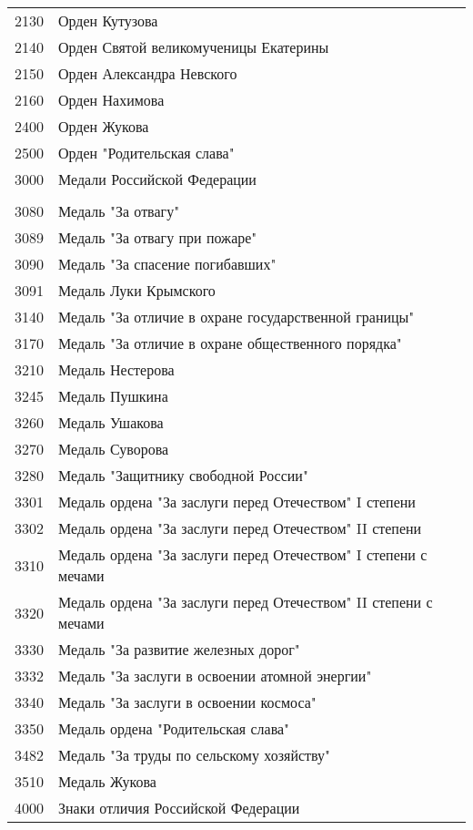 \documentclass[10pt, a4paper, titlepage]{article}
\begin{document}
\begin{center}
\begin{longtable}{rp{}}
        2130 & Орден Кутузова \\
        2140 & Орден Святой великомученицы Екатерины \\
        2150 & Орден Александра Невского \\
        2160 & Орден Нахимова \\
        2400 & Орден Жукова \\
        2500 & Орден "Родительская слава" \\
        3000 & Медали Российской Федерации \\ \\
        3080 & Медаль "За отвагу" \\
        3089 & Медаль "За отвагу при пожаре" \\
        3090 & Медаль "За спасение погибавших" \\
        3091 & Медаль Луки Крымского \\
        3140 & Медаль "За отличие в охране государственной границы" \\
        3170 & Медаль "За отличие в охране общественного порядка" \\
        3210 & Медаль Нестерова \\
        3245 & Медаль Пушкина \\
        3260 & Медаль Ушакова \\
        3270 & Медаль Суворова \\
        3280 & Медаль "Защитнику свободной России" \\
        3301 & Медаль ордена "За заслуги перед Отечеством" I степени \\
        3302 & Медаль ордена "За заслуги перед Отечеством" II степени \\
        3310 & Медаль ордена "За заслуги перед Отечеством" I степени с мечами \\
        3320 & Медаль ордена "За заслуги перед Отечеством" II степени с мечами \\
        3330 & Медаль "За развитие железных дорог" \\
        3332 & Медаль "За заслуги в освоении атомной энергии" \\
        3340 & Медаль "За заслуги в освоении космоса" \\
        3350 & Медаль ордена "Родительская слава" \\
        3482 & Медаль "За труды по сельскому хозяйству" \\
        3510 & Медаль Жукова \\
        4000 & Знаки отличия Российской Федерации \\

\end{longtable}
\end{center}
\end{document}
